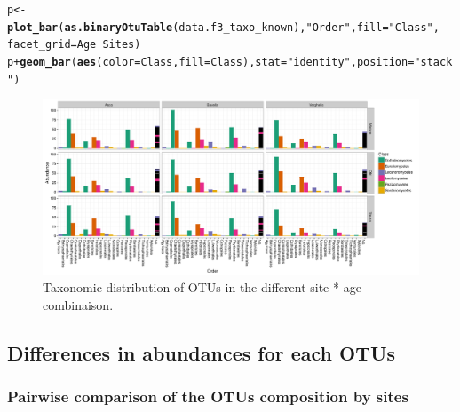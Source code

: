 \documentclass[12pt]{article}\usepackage[]{graphicx}\usepackage[]{color}
\makeatletter
\def\maxwidth{ %
  \ifdim\Gin@nat@width>\linewidth
    \linewidth
  \else
    \Gin@nat@width
  \fi
}
\newcommand{\hlstr}[1]{\textcolor[rgb]{0.192,0.494,0.8}{#1}}%
\newcommand{\hlopt}[1]{\textcolor[rgb]{0,0,0}{#1}}%
\newcommand{\hlstd}[1]{\textcolor[rgb]{0.345,0.345,0.345}{#1}}%
\newcommand{\hlkwb}[1]{\textcolor[rgb]{0.69,0.353,0.396}{#1}}%
\newcommand{\hlkwc}[1]{\textcolor[rgb]{0.333,0.667,0.333}{#1}}%
\newcommand{\hlkwd}[1]{\textcolor[rgb]{0.737,0.353,0.396}{\textbf{#1}}}%
\newenvironment{kframe}{%
 \def\at@end@of@kframe{}%
 \ifinner\ifhmode%
  \def\at@end@of@kframe{\end{minipage}}%
  \begin{minipage}{\columnwidth}%
 \fi\fi%
 \def\FrameCommand##1{\hskip\@totalleftmargin \hskip-\fboxsep
 \colorbox{shadecolor}{##1}\hskip-\fboxsep
     \hskip-\linewidth \hskip-\@totalleftmargin \hskip\columnwidth}%
 \MakeFramed {\advance\hsize-\width
   \@totalleftmargin\z@ \linewidth\hsize
   \@setminipage}}%
 {\par\unskip\endMakeFramed%
 \at@end@of@kframe}
\newenvironment{knitrout}{}{} %
\numberwithin{figure}{section}
\makeatother
\begin{document}
\begin{landscape}
\begin{knitrout}\small
{}\color{fgcolor}\begin{kframe}
\begin{alltt}
\hlstd{p} \hlkwb{<-} \hlkwd{plot_bar}\hlstd{(}\hlkwd{as.binaryOtuTable}\hlstd{(data.f3_taxo_known),} \hlstr{"Order"}\hlstd{,} \hlkwc{fill} \hlstd{=} \hlstr{"Class"}\hlstd{,}
              \hlkwc{facet_grid} \hlstd{= Age} \hlopt{~} \hlstd{Sites)}
\hlstd{p} \hlopt{+} \hlkwd{geom_bar}\hlstd{(}\hlkwd{aes}\hlstd{(}\hlkwc{color} \hlstd{= Class,} \hlkwc{fill} \hlstd{= Class),} \hlkwc{stat} \hlstd{=} \hlstr{"identity"}\hlstd{,} \hlkwc{position} \hlstd{=} \hlstr{"stack"}\hlstd{)}
\end{alltt}
\end{kframe}\begin{figure}

{\centering \includegraphics[width=\maxwidth]{figure/unnamed-chunk-67-1} 

}

\caption[Taxonomic distribution of OTUs in the different site * age combinaison]{Taxonomic distribution of OTUs in the different site * age combinaison.}\label{fig:unnamed-chunk-67}
\end{figure}


\end{knitrout}
\end{landscape}


  \subsection{Differences in abundances for each OTUs}
    \subsubsection{Pairwise comparison of the OTUs composition by sites}
\end{document}
